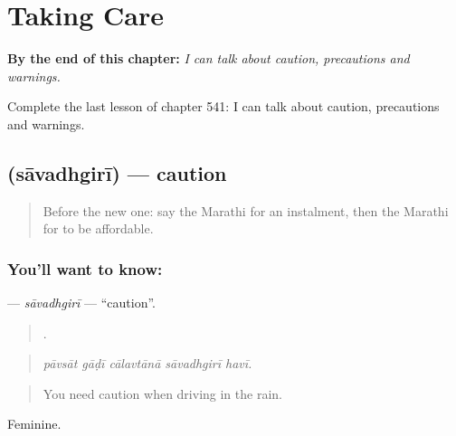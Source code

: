 
\chapter{Taking Care}
\label{ch:mr-taking-care}

\begin{chapteropening}
\textbf{By the end of this chapter:} \emph{I can talk about caution, precautions and warnings.}

Complete the last lesson of chapter 541: I can talk about caution, precautions and warnings.
\end{chapteropening}

\section[\texorpdfstring{\mr{सावधगिरी} (sāvadhgirī)}{सावधगिरी (sāvadhgirī)}]{ (sāvadhgirī) — caution}

\label{lesson:MR-C541-savadhgiri}



\begin{quote}
Before the new one: say the Marathi for an instalment, then the Marathi for to be affordable.
\end{quote}

\subsection*{You'll want to know: }
\textbf{} — \emph{sāvadhgirī} — \textquotedblleft{}caution\textquotedblright{}.

\begin{quote}
    .
\end{quote}

\begin{quote}
\emph{pāvsāt gāḍī cālavtānā sāvadhgirī havī.}
\end{quote}

\begin{quote}
You need caution when driving in the rain.
\end{quote}

Feminine.

